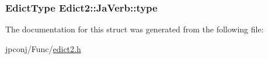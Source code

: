 \subsubsection[{\texorpdfstring{type}{type}}]{\setlength{\rightskip}{0pt plus 5cm}Edict\+Type Edict2\+::\+Ja\+Verb\+::type}\hypertarget{struct_edict2_1_1_ja_verb_afd43ce42c23585223a81b18ff69345f6}{}\label{struct_edict2_1_1_ja_verb_afd43ce42c23585223a81b18ff69345f6}


The documentation for this struct was generated from the following file\+:\begin{DoxyCompactItemize}
\item 
jpconj/\+Func/\hyperlink{edict2_8h}{edict2.\+h}\end{DoxyCompactItemize}
